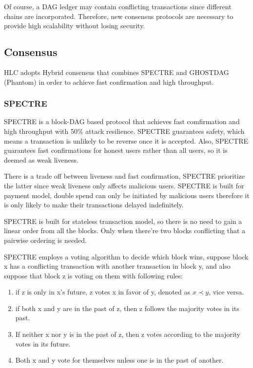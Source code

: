 \documentclass[a4paper,11pt]{article}
\begin{document}
Of course, a DAG ledger may contain conflicting transactions since different
chains are incorporated. Therefore, new consensus protocols are necessary to
provide high scalability without losing security.

\subsection{Consensus}
HLC adopts Hybrid consensus that combines SPECTRE and GHOSTDAG (Phantom) in order to achieve fast confirmation and high throughput.


\subsubsection*{SPECTRE}
SPECTRE is a block-DAG based protocol that achieves fast comfirmation and high throughput with 50\% attack resilience. SPECTRE guarantees safety, which means a transaction is unlikely to be reverse once it is accepted. Also, SPECTRE guarantees fast confirmations for honest users rather than all users, so it is deemed as weak liveness.

There is a trade off between liveness and fast confirmation, SPECTRE prioritize the latter since weak liveness only affects malicious users. SPECTRE is built for payment model, double spend can only be initiated by malicious users therefore it is only likely to make their transactions delayed indefinitely.

SPECTRE is built for stateless transaction model, so there is no need to gain a linear order from all the blocks. Only when there're two blocks conflicting that a pairwise ordering is needed.

SPECTRE employs a voting algorithm to decide which block wins, suppose block x has a conflicting transaction with another transaction in block y, and also suppose that block z is voting on them with following rules:


\begin{enumerate}
	\item if z is only in x's future, z votes x in favor of y, denoted as $x \prec y$, vice versa.
	\item if both x and y are in the past of z, then z follows the majority votes in its past.
	\item If neither x nor y is in the past of z, then z votes according to the majority votes in its future.
	\item Both x and y vote for themselves unless one is in the past of another.
\end{enumerate}
\end{document}
